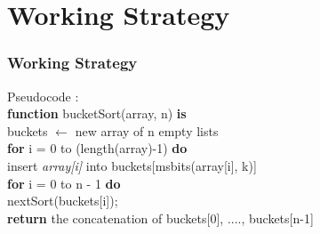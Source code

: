 \documentclass{beamer}
\begin{document}
\section{Working Strategy}

\begin{frame}
	\frametitle{Working Strategy}
	{\Large Pseudocode :}\\ 
	\textbf{function} bucketSort(array, n) \textbf{is}\\
	buckets $\leftarrow$ new array of n empty lists\\
	\textbf{for} i = 0 to (length(array)-1) \textbf{do}\\
	insert \emph{array[i]} into buckets[msbits(array[i], k)]\\
	 \textbf{for} i = 0 to n - 1 \textbf{do}\\
	 nextSort(buckets[i]);\\
  \textbf{return} the concatenation of buckets[0], ...., buckets[n-1]
\end{frame}  
  
\end{document}
